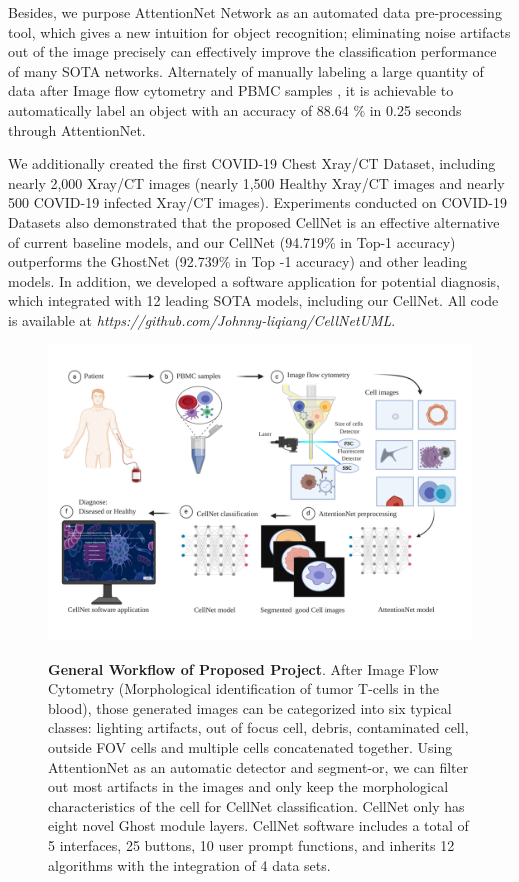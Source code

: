 Besides, we purpose AttentionNet Network as an automated data pre-processing tool, which gives a new intuition for object recognition; eliminating noise artifacts out of the image precisely can effectively improve the classification performance of many SOTA networks. Alternately of manually labeling a large quantity of data after Image flow cytometry and PBMC samples \cite{12}, it is achievable to automatically label an object with an accuracy of 88.64 \% in 0.25 seconds through AttentionNet. 

We additionally created the first COVID-19 Chest Xray/CT Dataset, including nearly 2,000 Xray/CT images (nearly 1,500 Healthy Xray/CT images and nearly 500 COVID-19 infected Xray/CT images). Experiments conducted on COVID-19 Datasets also demonstrated that the proposed CellNet is an effective alternative of current baseline models, and our CellNet (94.719\% in Top-1 accuracy) outperforms the GhostNet\cite{19} (92.739\%  in Top -1 accuracy) and other leading models. In addition, we developed a software application for potential diagnosis, which integrated with 12 leading SOTA models, including our CellNet. All code is available at \textit{https://github.com/Johnny-liqiang/CellNetUML}.

\label{sub:figures}
\begin{figure}[t]
	\begin{center}
	\includegraphics[width=\textwidth]{thesis-template-master/images/general workflow2.pdf}
	\label{fig:lenna}
	\end{center}
	\caption{\textbf{General Workflow of Proposed Project}. After Image Flow Cytometry (Morphological identification of tumor T-cells in the blood), those generated images can be categorized into six typical classes: lighting artifacts, out of focus cell, debris, contaminated cell, outside FOV cells and multiple cells concatenated together. Using AttentionNet as an automatic detector and segment-or, we can filter out most artifacts in the images and only keep the morphological characteristics of the cell for CellNet classification. CellNet only has eight novel Ghost module layers. CellNet software includes a total of 5 interfaces, 25 buttons, 10 user prompt functions, and inherits 12 algorithms with the integration of 4 data sets.}
	\label{fig:lennas}
\end{figure}

